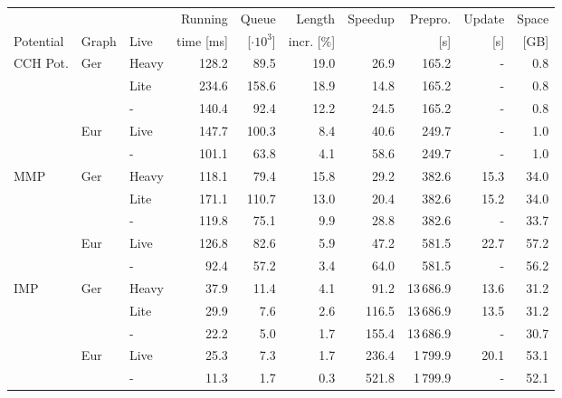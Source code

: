\begin{tabular}{lllrrrrrrr}
\toprule
          &         &      & Running   & Queue          &  Length     & Speedup & Prepro. & Update & Space \\
Potential & Graph  & Live  & time [ms] & [$\cdot 10^3$] &  incr. [\%] &         &     [s] &    [s] &  [GB] \\
\midrule
CCH Pot. & Ger & Heavy &     128.2 &           89.5 &        19.0 &    26.9 &     165.2 &    - &  0.8 \\
         &     & Lite  &     234.6 &          158.6 &        18.9 &    14.8 &     165.2 &    - &  0.8 \\
         &     & -     &     140.4 &           92.4 &        12.2 &    24.5 &     165.2 &    - &  0.8 \\
         & Eur & Live  &     147.7 &          100.3 &         8.4 &    40.6 &     249.7 &    - &  1.0 \\
         &     & -     &     101.1 &           63.8 &         4.1 &    58.6 &     249.7 &    - &  1.0 \\ \addlinespace
MMP      & Ger & Heavy &     118.1 &           79.4 &        15.8 &    29.2 &     382.6 & 15.3 & 34.0 \\
         &     & Lite  &     171.1 &          110.7 &        13.0 &    20.4 &     382.6 & 15.2 & 34.0 \\
         &     & -     &     119.8 &           75.1 &         9.9 &    28.8 &     382.6 &    - & 33.7 \\
         & Eur & Live  &     126.8 &           82.6 &         5.9 &    47.2 &     581.5 & 22.7 & 57.2 \\
         &     & -     &      92.4 &           57.2 &         3.4 &    64.0 &     581.5 &    - & 56.2 \\ \addlinespace
IMP      & Ger & Heavy &      37.9 &           11.4 &         4.1 &    91.2 & 13\,686.9 & 13.6 & 31.2 \\
         &     & Lite  &      29.9 &            7.6 &         2.6 &   116.5 & 13\,686.9 & 13.5 & 31.2 \\
         &     & -     &      22.2 &            5.0 &         1.7 &   155.4 & 13\,686.9 &    - & 30.7 \\
         & Eur & Live  &      25.3 &            7.3 &         1.7 &   236.4 &  1\,799.9 & 20.1 & 53.1 \\
         &     & -     &      11.3 &            1.7 &         0.3 &   521.8 &  1\,799.9 &    - & 52.1 \\
\bottomrule
\end{tabular}
